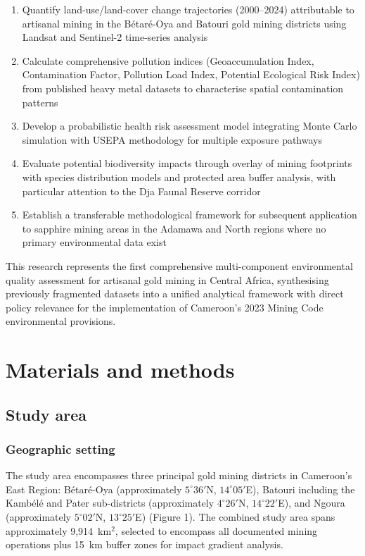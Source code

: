 \documentclass[preprint,12pt,authoryear]{elsarticle}
\begin{document}
\begin{enumerate}
\item Quantify land-use/land-cover change trajectories (2000--2024) attributable to artisanal mining in the B\'{e}tar\'{e}-Oya and Batouri gold mining districts using Landsat and Sentinel-2 time-series analysis
\item Calculate comprehensive pollution indices (Geoaccumulation Index, Contamination Factor, Pollution Load Index, Potential Ecological Risk Index) from published heavy metal datasets to characterise spatial contamination patterns
\item Develop a probabilistic health risk assessment model integrating Monte Carlo simulation with USEPA methodology for multiple exposure pathways
\item Evaluate potential biodiversity impacts through overlay of mining footprints with species distribution models and protected area buffer analysis, with particular attention to the Dja Faunal Reserve corridor
\item Establish a transferable methodological framework for subsequent application to sapphire mining areas in the Adamawa and North regions where no primary environmental data exist
\end{enumerate}

This research represents the first comprehensive multi-component environmental quality assessment for artisanal gold mining in Central Africa, synthesising previously fragmented datasets into a unified analytical framework with direct policy relevance for the implementation of Cameroon's 2023 Mining Code environmental provisions.


\section{Materials and methods}

\subsection{Study area}

\subsubsection{Geographic setting}

The study area encompasses three principal gold mining districts in Cameroon's East Region: B\'{e}tar\'{e}-Oya (approximately $5^{\circ}36'$N, $14^{\circ}05'$E), Batouri including the Kamb\'{e}l\'{e} and Pater sub-districts (approximately $4^{\circ}26'$N, $14^{\circ}22'$E), and Ngoura (approximately $5^{\circ}02'$N, $13^{\circ}25'$E) (Figure 1). The combined study area spans approximately 9,914~km$^{2}$, selected to encompass all documented mining operations plus 15~km buffer zones for impact gradient analysis.
\end{document}
